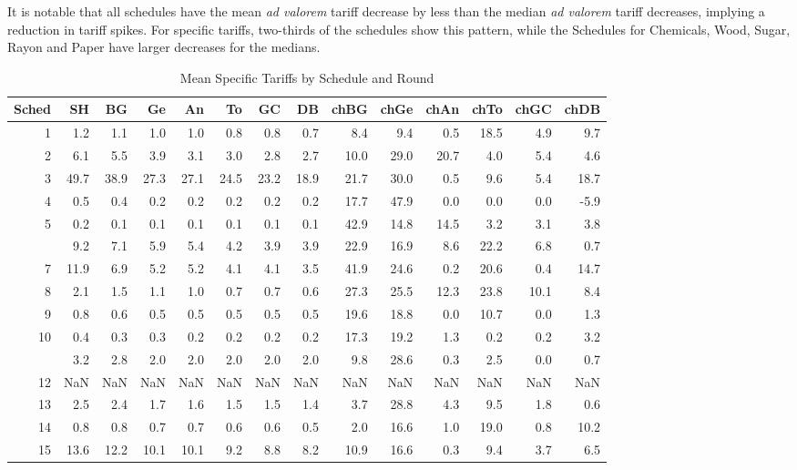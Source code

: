 \documentclass[
  12pt,
]{article}
\begin{document}
It is notable that all schedules have the mean \emph{ad valorem} tariff decrease by less than the median \emph{ad valorem} tariff decreases, implying a reduction in tariff spikes. For specific tariffs, two-thirds of the schedules show this pattern, while the Schedules for Chemicals, Wood, Sugar, Rayon and Paper have larger decreases for the medians.

\begin{table}[!h]

\caption{\label{tab:sp-sc-rd}Mean Specific Tariffs by Schedule and Round}
\centering
\begin{tabular}[t]{rrrrrrrrrrrrrr}
\toprule
Sched & SH & BG & Ge & An & To & GC & DB & chBG & chGe & chAn & chTo & chGC & chDB\\
\midrule
1 & 1.2 & 1.1 & 1.0 & 1.0 & 0.8 & 0.8 & 0.7 & 8.4 & 9.4 & 0.5 & 18.5 & 4.9 & 9.7\\
2 & 6.1 & 5.5 & 3.9 & 3.1 & 3.0 & 2.8 & 2.7 & 10.0 & 29.0 & 20.7 & 4.0 & 5.4 & 4.6\\
3 & 49.7 & 38.9 & 27.3 & 27.1 & 24.5 & 23.2 & 18.9 & 21.7 & 30.0 & 0.5 & 9.6 & 5.4 & 18.7\\
4 & 0.5 & 0.4 & 0.2 & 0.2 & 0.2 & 0.2 & 0.2 & 17.7 & 47.9 & 0.0 & 0.0 & 0.0 & -5.9\\
5 & 0.2 & 0.1 & 0.1 & 0.1 & 0.1 & 0.1 & 0.1 & 42.9 & 14.8 & 14.5 & 3.2 & 3.1 & 3.8\\
\addlinespace
6 & 9.2 & 7.1 & 5.9 & 5.4 & 4.2 & 3.9 & 3.9 & 22.9 & 16.9 & 8.6 & 22.2 & 6.8 & 0.7\\
7 & 11.9 & 6.9 & 5.2 & 5.2 & 4.1 & 4.1 & 3.5 & 41.9 & 24.6 & 0.2 & 20.6 & 0.4 & 14.7\\
8 & 2.1 & 1.5 & 1.1 & 1.0 & 0.7 & 0.7 & 0.6 & 27.3 & 25.5 & 12.3 & 23.8 & 10.1 & 8.4\\
9 & 0.8 & 0.6 & 0.5 & 0.5 & 0.5 & 0.5 & 0.5 & 19.6 & 18.8 & 0.0 & 10.7 & 0.0 & 1.3\\
10 & 0.4 & 0.3 & 0.3 & 0.2 & 0.2 & 0.2 & 0.2 & 17.3 & 19.2 & 1.3 & 0.2 & 0.2 & 3.2\\
\addlinespace
11 & 3.2 & 2.8 & 2.0 & 2.0 & 2.0 & 2.0 & 2.0 & 9.8 & 28.6 & 0.3 & 2.5 & 0.0 & 0.7\\
12 & NaN & NaN & NaN & NaN & NaN & NaN & NaN & NaN & NaN & NaN & NaN & NaN & NaN\\
13 & 2.5 & 2.4 & 1.7 & 1.6 & 1.5 & 1.5 & 1.4 & 3.7 & 28.8 & 4.3 & 9.5 & 1.8 & 0.6\\
14 & 0.8 & 0.8 & 0.7 & 0.7 & 0.6 & 0.6 & 0.5 & 2.0 & 16.6 & 1.0 & 19.0 & 0.8 & 10.2\\
15 & 13.6 & 12.2 & 10.1 & 10.1 & 9.2 & 8.8 & 8.2 & 10.9 & 16.6 & 0.3 & 9.4 & 3.7 & 6.5\\
\bottomrule
\end{tabular}
\end{table}
\end{document}
